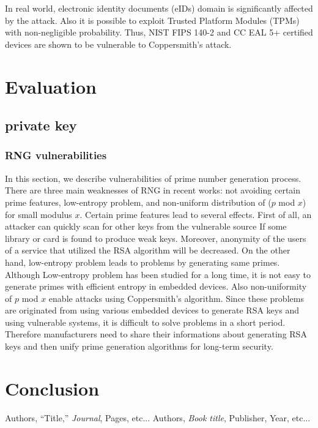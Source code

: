 \documentclass[a4paper]{article}
\begin{document}
In real world, electronic identity documents (eIDs) domain is significantly affected by the attack. Also it is possible to exploit Trusted Platform Modules (TPMs) with non-negligible probability. Thus, NIST FIPS 140-2 and CC EAL 5+ certified devices are shown to be vulnerable to Coppersmith's attack. 


\section{Evaluation}

\subsection{private key}

\subsubsection{RNG vulnerabilities}
In this section, we describe vulnerabilities of prime number generation process. There are three main weaknesses of RNG in recent works: not avoiding certain prime features, low-entropy problem, and non-uniform distribution of ($p$ mod $x$) for small modulus $x$. Certain prime features lead to several effects. First of all, an attacker can quickly scan for other keys from the vulnerable source If some library or card is found to produce weak keys. Moreover, anonymity of the users of a service that utilized the RSA algorithm will be decreased. On the other hand, low-entropy problem leads to problems by generating same primes. Although Low-entropy problem has been studied for a long time, it is not easy to generate primes with efficient entropy in embedded devices. Also non-uniformity of $p$ mod $x$ enable attacks using Coppersmith's algorithm. Since these problems are originated from using various embedded devices to generate RSA keys and using vulnerable systems, it is difficult to solve problems in a short period. 
Therefore manufacturers need to share their informations about generating RSA keys and then unify prime generation algorithms for long-term security.

\section{Conclusion}


\begin{thebibliography}{9}
Authors, ``Title,'' {\em Journal}, Pages, etc...
Authors, {\em Book title}, Publisher, Year, etc...
\end{thebibliography}
\end{document}
